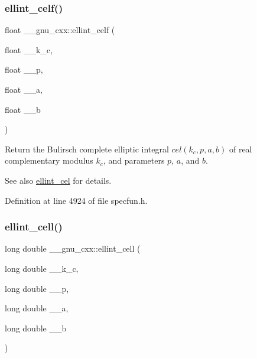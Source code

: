 \subsubsection{\texorpdfstring{ellint\+\_\+celf()}{ellint\_celf()}}
{\footnotesize\ttfamily float \+\_\+\+\_\+gnu\+\_\+cxx\+::ellint\+\_\+celf (\begin{DoxyParamCaption}\item[{float}]{\+\_\+\+\_\+k\+\_\+c,  }\item[{float}]{\+\_\+\+\_\+p,  }\item[{float}]{\+\_\+\+\_\+a,  }\item[{float}]{\+\_\+\+\_\+b }\end{DoxyParamCaption})\hspace{0.3cm}{\ttfamily [inline]}}

Return the Bulirsch complete elliptic integral $ cel(k_c,p,a,b) $ of real complementary modulus $ k_c $, and parameters $ p $, $ a $, and $ b $.

\begin{DoxySeeAlso}{See also}
\hyperlink{group__gnu__math__spec__func_ga6e44a0d90500e56ef4b3aba6efd7e2b0}{ellint\+\_\+cel} for details. 
\end{DoxySeeAlso}


Definition at line 4924 of file specfun.\+h.

\mbox{\label{group__gnu__math__spec__func_gaa5add699fb2b4b02e63f8725a3a79750}} 
\subsubsection{\texorpdfstring{ellint\+\_\+cell()}{ellint\_cell()}}
{\footnotesize\ttfamily long double \+\_\+\+\_\+gnu\+\_\+cxx\+::ellint\+\_\+cell (\begin{DoxyParamCaption}\item[{long double}]{\+\_\+\+\_\+k\+\_\+c,  }\item[{long double}]{\+\_\+\+\_\+p,  }\item[{long double}]{\+\_\+\+\_\+a,  }\item[{long double}]{\+\_\+\+\_\+b }\end{DoxyParamCaption})\hspace{0.3cm}{\ttfamily [inline]}}

